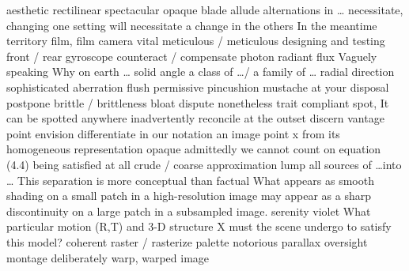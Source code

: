 \documentclass[12pt]{article}
\begin{document}
aesthetic 
rectilinear 
spectacular 
opaque 
blade 
allude 
alternations in \dots 
necessitate, changing one setting will necessitate a change in the others 
In the meantime 
territory 
film, film camera 
vital 
meticulous / meticulous designing and testing 
front / rear 
gyroscope 
counteract / compensate 
photon 
radiant flux 
Vaguely speaking 
Why on earth \dots 
solid angle 
a class of \dots / a family of \dots 
radial direction 
sophisticated 
aberration 
flush 
permissive 
pincushion 
mustache 
at your disposal 
postpone 
brittle / brittleness 
bloat 
dispute 
nonetheless 
trait 
compliant 
spot, It can be spotted anywhere 
inadvertently 
reconcile 
at the outset 
discern 
vantage point 
envision 
differentiate in our notation an image point x from its homogeneous representation 
opaque 
admittedly 
we cannot count on equation (4.4) being satisfied at all 
crude / coarse approximation 
lump all sources of \dots into \dots 
This separation is more conceptual than factual 
What appears as smooth shading on a small patch in a high-resolution image may appear as a sharp discontinuity on a large patch in a subsampled image. 
serenity 
violet 
What particular motion (R,T) and 3-D structure X must the scene undergo to satisfy this model? 
coherent 
raster / rasterize 
palette 
notorious 
parallax 
oversight 
montage 
deliberately 
warp, warped image 
\end{document}
